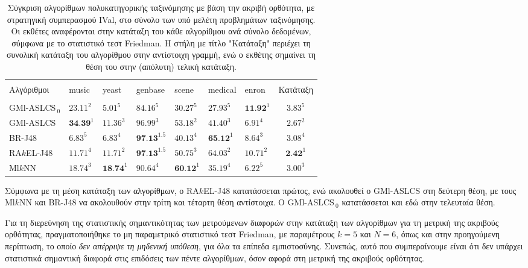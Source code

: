 \begin{table}[!h]
\begin{center}
    \caption[Σύγκριση αλγορίθμων πολυκατηγορικής ταξινόμησης με βάση την Ακριβή Ορθότητα, με μέθοδο ταξινόμησης IVal, στο σύνολο των υπό μελέτη προβλημάτων ταξινόμησης.] {Σύγκριση αλγορίθμων πολυκατηγορικής ταξινόμησης με βάση την ακριβή ορθότητα, με στρατηγική συμπερασμού IVal, στο σύνολο των υπό μελέτη προβλημάτων ταξινόμησης. Οι εκθέτες αναφέρονται στην κατάταξη του κάθε αλγορίθμου ανά σύνολο δεδομένων, σύμφωνα με το στατιστικό τεστ Friedman. Η στήλη με τίτλο "Κατάταξη" περιέχει τη συνολική κατάταξη του αλγορίθμου στην αντίστοιχη γραμμή, ενώ ο εκθέτης σημαίνει τη θέση του στην (απόλυτη) τελική κατάταξη.}
	\label{table:exactMatchBasedComparison}
    \begin{tabular}{l|llllll|c}
        \hline \\ [-2ex] 
    Αλγόριθμοι        & music     & yeast     & genbase       & scene     & medical   & enron  & Κατάταξη \\
    \hline \\ [-2ex] 
    GMl-ASLCS$_{\:0}$ & $23.11^2$ & $5.01^5$  & $84.16^5$     & $30.27^5$ & $27.93^5$ & $\textbf{11.92}^1$ & $3.83^5$     \\
    GMl-ASLCS         & $\textbf{34.39}^1$ & $11.36^3$ & $96.99^3$     & $53.18^2$ & $41.40^3$ & $6.91^4$  & $2.67^2$   \\
    BR-J48            & $6.83^5$  & $6.83^4$  & $\textbf{97.13}^{1.5}$ & $40.13^4$ & $\textbf{65.12}^1$ & $8.64^3$  & $3.08^4$   \\
    RA$k$EL-J48       & $11.71^4$ & $11.71^2$ & $\textbf{97.13}^{1.5}$ & $50.75^3$ & $64.03^2$ & $10.71^2$ & $\textbf{2.42}^1$    \\
    Ml$k$NN           & $18.74^3$ & $\textbf{18.74}^1$ & $90.64^4$     & $\textbf{60.12}^1$ & $35.19^4$ & $6.22^5$  & $3.00^3$     \\ \hline
    \end{tabular}
\end{center}
\end{table}

Σύμφωνα με τη μέση κατάταξη των αλγορίθμων, ο RA$k$EL-J48 κατατάσσεται πρώτος, ενώ ακολουθεί ο GMl-ASLCS στη δεύτερη θέση, με τους Ml$k$NN και BR-J48 να ακολουθούν στην τρίτη και τέταρτη θέση αντίστοιχα. Ο GMl-ASLCS$_{\:0}$ κατατάσσεται και εδώ στην τελευταία θέση.

Για τη διερεύνηση της στατιστικής σημαντικότητας των μετρούμενων διαφορών στην κατάταξη των αλγορίθμων για τη μετρική της ακριβούς ορθότητας, πραγματοποιήθηκε το μη παραμετρικό στατιστικό τεστ Friedman, με παραμέτρους $k=5$ και $N=6$, όπως και στην προηγούμενη περίπτωση, το οποίο \emph{δεν απέρριψε τη μηδενική υπόθεση}, για όλα τα επίπεδα εμπιστοσύνης. Συνεπώς, αυτό που συμπεραίνουμε είναι ότι δεν υπάρχει στατιστικά σημαντική διαφορά στις επιδόσεις των πέντε αλγορίθμων, όσον αφορά στη μετρική της ακριβούς ορθότητας.

